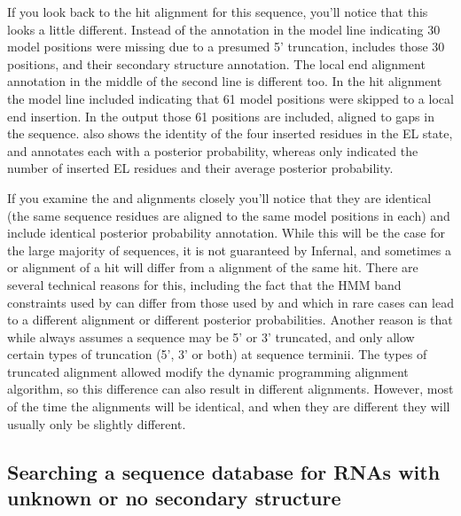 If you look back to the  hit alignment for this sequence,
you'll notice that this looks a little different. Instead of the
\otext{<[30]*} annotation in the model line indicating 30 model
positions were missing due to a presumed 5' truncation, 
includes those 30 positions, and their secondary structure
annotation. The local end alignment annotation in the middle of the
second line is different too. In the  hit alignment the
model line included \otext{*[61]*} indicating that 61 model positions
were skipped to a local end insertion. In the  output
those 61 positions are included, aligned to gaps in the sequence. 
 also shows the identity of the four inserted residues
in the EL state, and annotates each with a posterior probability,
whereas  only indicated the number of inserted EL
residues and their average posterior probability. 

If you examine the  and  alignments closely
you'll notice that they are identical (the same sequence residues are
aligned to the same model positions in each) and include identical
posterior probability annotation. While this will be the case for the
large majority of sequences, it is not guaranteed by Infernal, and
sometimes a  or  alignment of a hit will
differ from a  alignment of the same hit. There are
several technical reasons for this, including the fact that the HMM
band constraints used by  can differ from those used by
 and  which in rare cases can lead to a
different alignment or different posterior probabilities. Another
reason is that while  always assumes a sequence may be
5' or 3' truncated,  and  only allow
certain types of truncation (5', 3' or both) at sequence
terminii. The types of truncated alignment allowed modify the
dynamic programming alignment algorithm, so this difference can also
result in different alignments. However, most of the time the
alignments will be identical, and when they are different they will
usually only be slightly different.

\subsection{Searching a sequence database for RNAs with unknown or no
 secondary structure}

